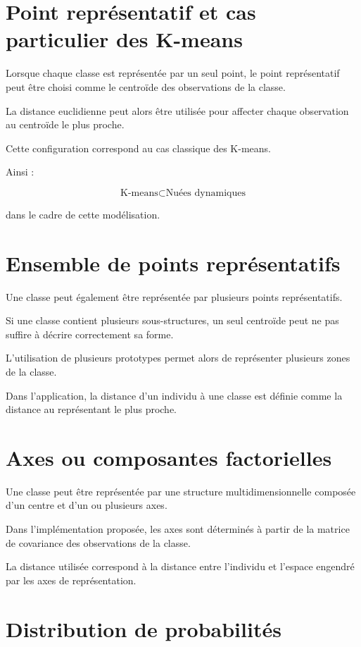 \documentclass[12pt,a4paper]{report}
\begin{document}
\section{Point représentatif et cas particulier des K-means}

Lorsque chaque classe est représentée par un seul point, le point
représentatif peut être choisi comme le centroïde des observations
de la classe.

La distance euclidienne peut alors être utilisée pour affecter chaque
observation au centroïde le plus proche.

Cette configuration correspond au cas classique des K-means.

Ainsi :

\[
\boxed{
\text{K-means}
\subset
\text{Nuées dynamiques}
}
\]

dans le cadre de cette modélisation.

\section{Ensemble de points représentatifs}

Une classe peut également être représentée par plusieurs points
représentatifs.

Si une classe contient plusieurs sous-structures, un seul centroïde
peut ne pas suffire à décrire correctement sa forme.

L'utilisation de plusieurs prototypes permet alors de représenter
plusieurs zones de la classe.

Dans l'application, la distance d'un individu à une classe est définie
comme la distance au représentant le plus proche.

\section{Axes ou composantes factorielles}

Une classe peut être représentée par une structure multidimensionnelle
composée d'un centre et d'un ou plusieurs axes.

Dans l'implémentation proposée, les axes sont déterminés à partir de
la matrice de covariance des observations de la classe.

La distance utilisée correspond à la distance entre l'individu et
l'espace engendré par les axes de représentation.

\section{Distribution de probabilités}
\end{document}
